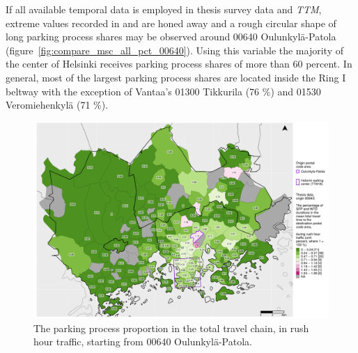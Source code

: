 If all available temporal data is employed in thesis survey data and \textit{TTM}, extreme values recorded in  and  are honed away and a rough circular shape of long parking process shares may be observed around 00640 Oulunkylä-Patola (figure~\ref{fig:compare_msc_all_pct_00640}). Using this variable the majority of the center of Helsinki receives parking process shares of more than 60 percent. In general, most of the largest parking process shares are located inside the Ring I beltway with the exception of Vantaa's 01300 Tikkurila (76 \%) and 01530 Veromiehenkylä (71 \%).

\begin{figure}[H]%
    \centering
    \includegraphics[trim={0.9cm 0.3cm 0.25cm 0.3cm},clip,width=\textwidth]{images/compare_traveltimes_mapfill-msc_r_pct_fromzip-00640_28-09-2020.png}
    \caption[Parking process proportion from Oulunkylä-Patola, rush hour traffic]{The parking process proportion in the total travel chain, in rush hour traffic, starting from 00640 Oulunkylä-Patola.}%
    \label{fig:compare_msc_r_pct_00640}%
\end{figure}

